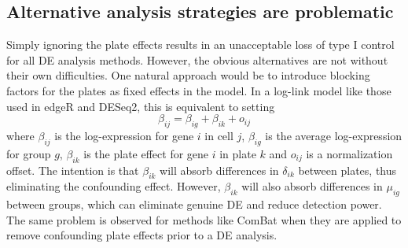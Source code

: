\documentclass[oupdraft]{bio}
\begin{document}
\subsection{Alternative analysis strategies are problematic}
Simply ignoring the plate effects results in an unacceptable loss of type I control for all DE analysis methods.
However, the obvious alternatives are not without their own difficulties.
One natural approach would be to introduce blocking factors for the plates as fixed effects in the model.
In a log-link model like those used in edgeR and DESeq2, this is equivalent to setting
\[
    \beta_{ij} = \beta_{ig} + \beta_{ik} + o_{ij}
\]
where $\beta_{ij}$ is the log-expression for gene $i$ in cell $j$, $\beta_{ig}$ is the average log-expression for group $g$, 
    $\beta_{ik}$ is the plate effect for gene $i$ in plate $k$ and $o_{ij}$ is a normalization offset.
The intention is that $\beta_{ik}$ will absorb differences in $\delta_{ik}$ between plates, thus eliminating the confounding effect.
However, $\beta_{ik}$ will also absorb differences in $\mu_{ig}$ between groups, which can eliminate genuine DE and reduce detection power.
The same problem is observed for methods like ComBat \citep{johnson2007adjusting} when they are applied to remove confounding plate effects prior to a DE analysis.
\end{document}
